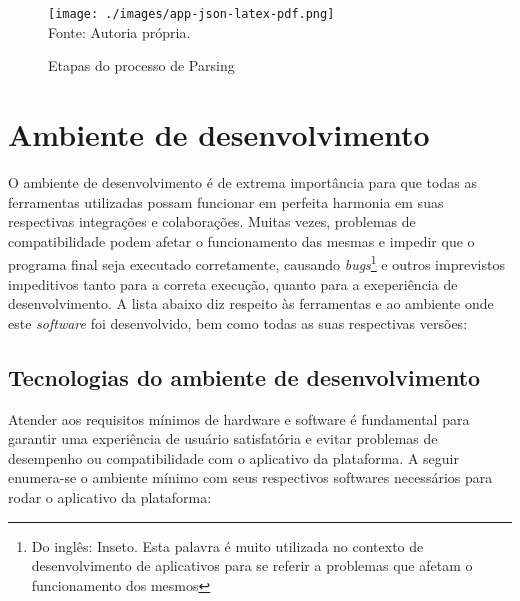 \begin{figure}[H]
    \centering
    \caption{Etapas do processo de Parsing}
    \texttt{[image: ./images/app-json-latex-pdf.png]}
    \label{fig:app-json-latex-pdf} \\
    \textnormal{\fontsize{10pt}{12pt}Fonte: Autoria própria.}
\end{figure}

\section{Ambiente de desenvolvimento}

O ambiente de desenvolvimento é de extrema importância para que todas as ferramentas
utilizadas possam funcionar em perfeita harmonia em suas respectivas integrações e
colaborações. Muitas vezes, problemas de compatibilidade podem afetar
o funcionamento das mesmas e impedir que o programa final
seja executado corretamente, causando
\textit{bugs}\footnote{Do inglês: Inseto. Esta palavra é muito utilizada no contexto de desenvolvimento de aplicativos
para se referir a problemas que afetam o funcionamento dos mesmos
}
e outros imprevistos impeditivos tanto para a correta execução, quanto
para a exeperiência de desenvolvimento.
A lista abaixo diz respeito às ferramentas e ao ambiente onde este \textit{software}
foi desenvolvido, bem como todas as suas respectivas versões:

\clearpage

\subsection{Tecnologias do ambiente de desenvolvimento}

Atender aos requisitos mínimos de hardware
e software é fundamental para garantir uma experiência de usuário satisfatória
e evitar problemas de desempenho ou compatibilidade com o aplicativo da plataforma.
A seguir enumera-se o ambiente mínimo com seus respectivos softwares necessários
para rodar o aplicativo da plataforma:

